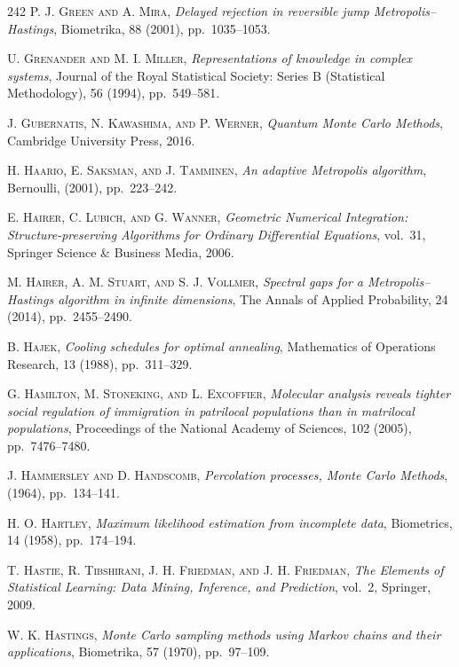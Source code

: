 \begin{thebibliography}{242}
\textsc{P. J. Green and A. Mira},
\textit{Delayed rejection in reversible jump Metropolis--Hastings},
Biometrika, 88 (2001), pp.\ 1035--1053.

\textsc{U. Grenander and M. I. Miller},
\textit{Representations of knowledge in complex systems},
Journal of the Royal Statistical Society: Series B (Statistical Methodology), 56 (1994), pp.\ 549--581.

\textsc{J. Gubernatis, N. Kawashima, and P. Werner},
\textit{Quantum Monte Carlo Methods},
Cambridge University Press, 2016.

\textsc{H. Haario, E. Saksman, and J. Tamminen},
\textit{An adaptive Metropolis algorithm},
Bernoulli, (2001), pp.\ 223--242.

\textsc{E. Hairer, C. Lubich, and G. Wanner},
\textit{Geometric Numerical Integration: Structure-preserving Algorithms for Ordinary Differential Equations},
vol.\ 31, Springer Science \& Business Media, 2006.

\textsc{M. Hairer, A. M. Stuart, and S. J. Vollmer},
\textit{Spectral gaps for a Metropolis--Hastings algorithm in infinite dimensions},
The Annals of Applied Probability, 24 (2014), pp.\ 2455--2490.

\textsc{B. Hajek},
\textit{Cooling schedules for optimal annealing},
Mathematics of Operations Research, 13 (1988), pp.\ 311--329.

\textsc{G. Hamilton, M. Stoneking, and L. Excoffier},
\textit{Molecular analysis reveals tighter social regulation of immigration in patrilocal populations than in matrilocal populations},
Proceedings of the National Academy of Sciences, 102 (2005), pp.\ 7476--7480.

\textsc{J. Hammersley and D. Handscomb},
\textit{Percolation processes, Monte Carlo Methods},
(1964), pp.\ 134--141.

\textsc{H. O. Hartley},
\textit{Maximum likelihood estimation from incomplete data},
Biometrics, 14 (1958), pp.\ 174--194.

\textsc{T. Hastie, R. Tibshirani, J. H. Friedman, and J. H. Friedman},
\textit{The Elements of Statistical Learning: Data Mining, Inference, and Prediction},
vol.\ 2, Springer, 2009.

\textsc{W. K. Hastings},
\textit{Monte Carlo sampling methods using Markov chains and their applications},
Biometrika, 57 (1970), pp.\ 97--109.


\end{thebibliography}
